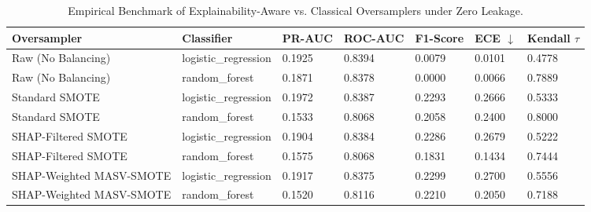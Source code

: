 \begin{table}[htbp]
\centering
\caption{Empirical Benchmark of Explainability-Aware vs. Classical Oversamplers under Zero Leakage.}
\label{tab:empirical_benchmarks}
\begin{tabular}{lllllll}
\toprule
Oversampler & Classifier & PR-AUC & ROC-AUC & F1-Score & ECE $\downarrow$ & Kendall $\tau$ \\
\midrule
Raw (No Balancing) & logistic_regression & 0.1925 & 0.8394 & 0.0079 & 0.0101 & 0.4778 \\
Raw (No Balancing) & random_forest & 0.1871 & 0.8378 & 0.0000 & 0.0066 & 0.7889 \\
Standard SMOTE & logistic_regression & 0.1972 & 0.8387 & 0.2293 & 0.2666 & 0.5333 \\
Standard SMOTE & random_forest & 0.1533 & 0.8068 & 0.2058 & 0.2400 & 0.8000 \\
SHAP-Filtered SMOTE & logistic_regression & 0.1904 & 0.8384 & 0.2286 & 0.2679 & 0.5222 \\
SHAP-Filtered SMOTE & random_forest & 0.1575 & 0.8068 & 0.1831 & 0.1434 & 0.7444 \\
SHAP-Weighted MASV-SMOTE & logistic_regression & 0.1917 & 0.8375 & 0.2299 & 0.2700 & 0.5556 \\
SHAP-Weighted MASV-SMOTE & random_forest & 0.1520 & 0.8116 & 0.2210 & 0.2050 & 0.7188 \\
\bottomrule
\end{tabular}
\end{table}
